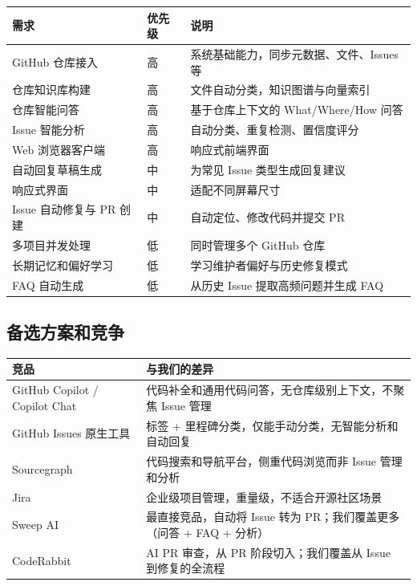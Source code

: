 \documentclass[10pt,a4paper]{article}
\newenvironment{ieeetable}{\begin{center}}{\end{center}}
\begin{document}
\begin{ieeetable}
    \begin{tabularx}{\textwidth}{L{4cm} C{1.8cm} X}
        \toprule
        \textbf{需求} & \textbf{优先级} & \textbf{说明} \\
        \midrule
        GitHub 仓库接入 & 高 & 系统基础能力，同步元数据、文件、Issues 等 \\
        \midrule
        仓库知识库构建 & 高 & 文件自动分类，知识图谱与向量索引 \\
        \midrule
        仓库智能问答 & 高 & 基于仓库上下文的 What/Where/How 问答 \\
        \midrule
        Issue 智能分析 & 高 & 自动分类、重复检测、置信度评分 \\
        \midrule
        Web 浏览器客户端 & 高 & 响应式前端界面 \\
        \midrule
        自动回复草稿生成 & 中 & 为常见 Issue 类型生成回复建议 \\
        \midrule
        响应式界面 & 中 & 适配不同屏幕尺寸 \\
        \midrule
        Issue 自动修复与 PR 创建 & 中 & 自动定位、修改代码并提交 PR \\
        \midrule
        多项目并发处理 & 低 & 同时管理多个 GitHub 仓库 \\
        \midrule
        长期记忆和偏好学习 & 低 & 学习维护者偏好与历史修复模式 \\
        \midrule
        FAQ 自动生成 & 低 & 从历史 Issue 提取高频问题并生成 FAQ \\
        \bottomrule
    \end{tabularx}
\end{ieeetable}

\subsection{备选方案和竞争}

\begin{ieeetable}
    \begin{tabularx}{\textwidth}{L{4cm} X}
        \toprule
        \textbf{竞品} & \textbf{与我们的差异} \\
        \midrule
        GitHub Copilot / Copilot Chat & 代码补全和通用代码问答，无仓库级别上下文，不聚焦 Issue 管理 \\
        \midrule
        GitHub Issues 原生工具 & 标签 + 里程碑分类，仅能手动分类，无智能分析和自动回复 \\
        \midrule
        Sourcegraph & 代码搜索和导航平台，侧重代码浏览而非 Issue 管理和分析 \\
        \midrule
        Jira & 企业级项目管理，重量级，不适合开源社区场景 \\
        \midrule
        Sweep AI & 最直接竞品，自动将 Issue 转为 PR；我们覆盖更多（问答 + FAQ + 分析） \\
        \midrule
        CodeRabbit & AI PR 审查，从 PR 阶段切入；我们覆盖从 Issue 到修复的全流程 \\
        \bottomrule
    \end{tabularx}
\end{ieeetable}
\end{document}
